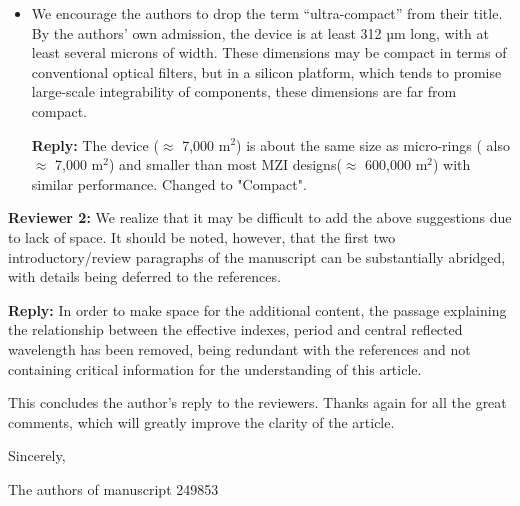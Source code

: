 \documentclass[]{letter}
\begin{document}
\begin{itemize}
\item We encourage the authors to drop the term “ultra-compact” from their title. By the authors’ own admission, the device is at least 312 µm long, with at least several microns of width. These dimensions may be compact in terms of conventional optical filters, but in a silicon platform, which tends to promise large-scale integrability of components, these dimensions are far from compact.

\textbf{Reply:} The device ($\approx$ 7,000 \textmu m$^2$) is about the same size as micro-rings ( also $\approx$ 7,000 \textmu m$^2$) and smaller than most MZI designs($\approx$ 600,000 \textmu m$^2$) with similar performance. Changed to "Compact".
\end{itemize}


\textbf{Reviewer 2:} We realize that it may be difficult to add the above suggestions due to lack of space. It should be noted, however, that the first two introductory/review paragraphs of the manuscript can be substantially abridged, with details being deferred to the references.

\textbf{Reply:} In order to make space for the additional content, the passage explaining the relationship between the effective indexes, period and central reflected wavelength has been removed, being redundant with the references and not containing critical information for the understanding of this article.


This concludes the author's reply to the reviewers. Thanks again for all the great comments, which will greatly improve the clarity of the article.

Sincerely,

The authors of manuscript 249853




 




%
%
\end{document}

